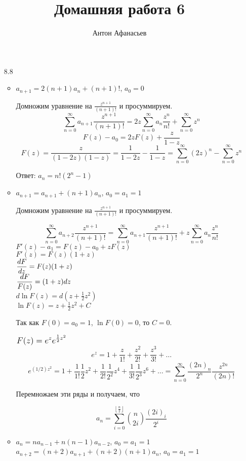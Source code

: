 \documentclass[10pt]{article}
\newcommand{\dsum}{\sum_{n=0}^\infty}
\begin{document}
\title{Домашняя работа 6}
\author{Антон Афанасьев}
\maketitle

\begin{enumerate}
	\item[8.8]
	\begin{itemize}
		\item $a_{n+1} = 2(n+1)a_n + (n+1)!$, $a_0 = 0$
		
		Домножим уравнение на $\frac{z^{n+1}}{(n+1)!}$ и просуммируем.
		$$\sum_{n=0}^\infty a_{n+1} \frac{z^{n+1}}{(n+1)!} = 2z \sum_{n=0}^\infty a_n \frac{z^n}{n!} + \sum_{n=0}^\infty z^n$$
		$$F(z) - a_0 = 2zF(z) +\frac{z}{1-z}$$
		$$F(z) = \frac{z}{(1-2z)(1-z)} = \frac{1}{1-2z} - \frac{1}{1-z} = \sum_{n=0}^\infty (2z)^n - \sum_{n=0}^\infty z^n$$
		
		Ответ: $a_n = n!(2^n - 1)$
		
		\item $a_{n+1} = a_{n+1} + (n+1)a_n$, $a_0 = a_1 = 1$
		
		Домножим уравнение на $\frac{z^{n+1}}{(n+1)!}$ и просуммируем.
		
		$$\dsum a_{n+2} \frac{z^{n+1}}{(n+1)!} = \dsum a_{n+1} \frac{z^{n+1}}{(n+1)!} + z \dsum a_n \frac{z^n}{n!}$$
		$F'(z) - a_1 = F(z) - a_0 + zF(z)$\\
		$F'(z) = F(z)(1+z)$\\
		$\mathlarger{\frac{dF}{dz} = F(z)(1+z)}$\\
		$\mathlarger{\frac{dF}{F(z)} = (1+z)dz}$\\
		$d\ln F(z) = d(z+\frac{1}{2}z^2)$\\
		$\ln F(z) = z+\frac{1}{2}z^2 + C$
		
		Так как $F(0)=a_0 = 1$, $\ln F(0) = 0$, то $C = 0$.
		
		$\mathlarger{\mathlarger{F(z) = e^z e^{\frac{1}{2}z^2}}}$
		$$e^z = 1 + \frac{z}{1!} + \frac{z^2}{2!} + \frac{z^3}{3!} + \ldots$$
		$$e^{(1/2)z^2} = 1 + \frac{1}{1!} \frac{1}{2} z^2 + \frac{1}{2!} \frac{1}{2^2} z^4 + \frac{1}{3!} \frac{1}{2^3} z^6 + \ldots = \dsum \frac{(2n)_n}{2^n} \frac{z^{2n}}{(2n)!}$$
		
		Перемножаем эти ряды и получаем, что
		
		$$a_n = \sum_{i=0}^{\left \lfloor \frac{n}{2} \right \rfloor} \binom{n}{2i} \frac{(2i)_i}{2^i}$$
		
		\item $a_n = na_{n-1} + n(n-1)a_{n-2}$, $a_0 = a_1 = 1$\\
		$a_{n+2} = (n+2)a_{n+1} + (n+2)(n+1)a_{n}$, $a_0 = a_1 = 1$
		

\end{itemize}
\end{enumerate}
\end{document}

